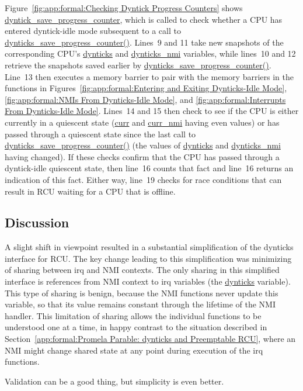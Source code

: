 Figure~\ref{fig:app:formal:Checking Dyntick Progress Counters}
shows \url{dyntick_save_progress_counter}, which is called to check
whether a CPU has entered dyntick-idle mode subsequent to a call
to \url{dynticks_save_progress_counter()}.
Lines~9 and 11 take new snapshots of the corresponding CPU's
\url{dynticks} and \url{dynticks_nmi} variables, while lines~10 and 12
retrieve the snapshots saved earlier by
\url{dynticks_save_progress_counter()}.
Line~13 then
executes a memory barrier to pair with the memory barriers in
the functions in
Figures~\ref{fig:app:formal:Entering and Exiting Dynticks-Idle Mode},
\ref{fig:app:formal:NMIs From Dynticks-Idle Mode}, and
\ref{fig:app:formal:Interrupts From Dynticks-Idle Mode}.
Lines~14 and 15 then check to see if the CPU is either currently in
a quiescent state (\url{curr} and \url{curr_nmi} having even values) or
has passed through a quiescent state since the last call to
\url{dynticks_save_progress_counter()} (the values of
\url{dynticks} and \url{dynticks_nmi} having changed).
If these checks confirm that the CPU has passed through a dyntick-idle
quiescent state, then line~16 counts that fact and line~16 returns
an indication of this fact.
Either way, line~19 checks for race conditions that can result in RCU
waiting for a CPU that is offline.

\subsection{Discussion}
\label{app:formal:Discussion}

A slight shift in viewpoint resulted in a substantial simplification
of the dynticks interface for RCU.
The key change leading to this simplification was minimizing of
sharing between irq and NMI contexts.
The only sharing in this simplified interface is references from NMI
context to irq variables (the \url{dynticks} variable).
This type of sharing is benign, because the NMI functions never update
this variable, so that its value remains constant through the lifetime
of the NMI handler.
This limitation of sharing allows the individual functions to be
understood one at a time, in happy contrast to the situation
described in
Section~\ref{app:formal:Promela Parable: dynticks and Preemptable RCU},
where an NMI might change shared state at any point during execution of
the irq functions.

Validation can be a good thing, but simplicity is even better.
